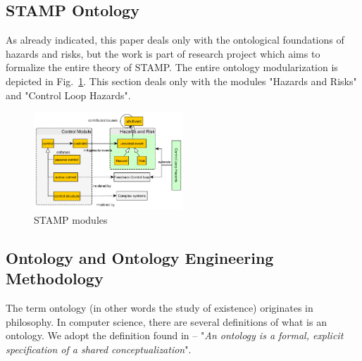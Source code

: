 \documentclass[sw]{iosart2x}
\begin{document}
\subsection{STAMP Ontology}
As already indicated, this paper deals only with the ontological foundations of hazards and risks, but the work is part of research project which aims to formalize the entire theory of STAMP. The entire ontology modularization is depicted in Fig.~\ref{fig:modules}. This section deals only with the modules "Hazards and Risks" and "Control Loop Hazards".

\begin{figure}
\begin{center}
\includegraphics[width=0.5\textwidth]{images/modules.png}
\end{center}
\caption{STAMP modules}
\label{fig:modules}
\end{figure}


\subsection{Ontology and Ontology Engineering Methodology}
\label{sec:method}
The term ontology (in other words the study of existence) originates in philosophy. In computer science, there are several definitions of what is an ontology. We adopt the definition found in \cite{Studer1998} -- "\emph{An ontology is a formal, explicit specification of a shared conceptualization}". 
\end{document}
